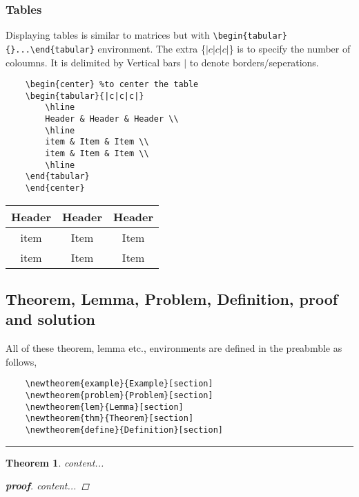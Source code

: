 \documentclass{article}
\newtheorem{thm}{Theorem}[section]
\begin{document}
\subsubsection{Tables}
\par Displaying tables is similar to matrices but with \verb*|\begin{tabular}{}...\end{tabular}| environment. The extra \{$|c|c|c|$\} is to specify the number of coloumns. It is delimited by Vertical bars $|$ to denote borders/seperations.
\begin{verbatim}
	\begin{center} %to center the table
	\begin{tabular}{|c|c|c|}		
		\hline 
		Header & Header & Header \\
		\hline
		item & Item & Item \\ 
		item & Item & Item \\
		\hline
	\end{tabular}
	\end{center}
\end{verbatim}
\begin{center}
\begin{tabular}{|c|c|c|} %
	\hline %
	Header & Header & Header \\
	\hline
	item & Item & Item \\ 
	item & Item & Item \\
	\hline
\end{tabular}
\end{center}



\subsection{Theorem, Lemma, Problem, Definition, proof and solution}

All of these theorem, lemma etc., environments are defined in the preabmble as follows,
\begin{verbatim}
	\newtheorem{example}{Example}[section]
	\newtheorem{problem}{Problem}[section]
	\newtheorem{lem}{Lemma}[section]
	\newtheorem{thm}{Theorem}[section]
	\newtheorem{define}{Definition}[section]
\end{verbatim}
\rule{\textheight}{0.4pt}
\begin{thm} 
	content...
	\begin{proof}[\textbf{proof}]
		content...
	\end{proof}
\end{thm}
\end{document}
